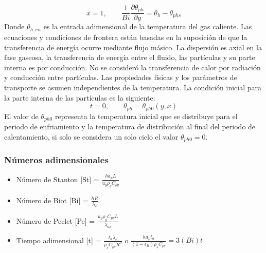\documentclass[12pt,letterpaper,final]{article}%
\begin{document}
\begin{equation}
	x = 1, \qquad \frac{1}{Bi}\frac{\partial \theta_{ph}}{\partial y} = \theta_h - \theta_{phs}
\end{equation}
Donde $\theta_{h,en}$ es la entrada adimensional de la temperatura del gas caliente. Las ecuaciones y condiciones de frontera están basadas en la suposición de que la transferencia de energía ocurre mediante flujo másico. La dispersión es axial en la fase gaseosa, la transferencia de energía entre el fluido, las partículas y su parte interna es por conducción. No se consideró la transferencia de calor por radiación y conducción entre partículas. Las propiedades físicas y los parámetros de transporte se asumen independientes de la temperatura. La condición inicial para la parte interna de las partículas es la siguiente:
\begin{equation}
	t=0, \qquad \theta_{ph} = \theta_{ph0}(y,x)
\end{equation}
El valor de $\theta_{ph0}$ representa la temperatura inicial que se distribuye para el periodo de enfriamiento y la temperatura de distribución al final del periodo de calentamiento, si solo se considera un solo ciclo el valor $\theta_{ph0}=0$.
\newline
\subsubsection*{Números adimensionales}
\begin{itemize}
	\item Número de Stanton [St] = $\frac{h a_p L}{u_g \rho_g C_{pg}}$
	\item Número de Biot [Bi] = $\frac{h R}{\lambda_e}$
	\item Número de Peclet [Pe] = $\frac{ u_g \rho_g C_{pg} L}{\lambda_{ax}}$
	\item Tiempo adimensional [t] = $\frac{t_a \lambda_e}{\rho_s C_{ps} R^2}$ o $ \frac{h a_p t_a }{(1-\epsilon_B)\rho_s C_{ps}} = 3 (Bi) t $
	
\end{itemize}
\end{document}

